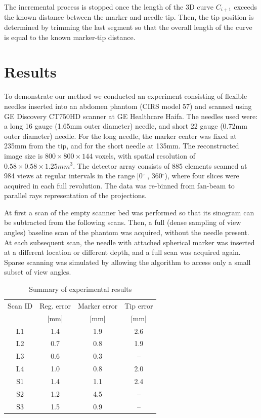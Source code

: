 \documentclass[letterpaper, 11 pt, conference]{ieeeconf}  %
\begin{document}
The incremental process is stopped once the length of the 3D curve $C_{i+1}$ exceeds the known distance between the marker and needle tip. Then, the tip position is determined by trimming the last segment so that the overall length of the curve is equal to the known marker-tip distance.

\section{Results}

To demonstrate our method we conducted an experiment consisting of flexible needles inserted into an abdomen phantom (CIRS model 57) and scanned using GE Discovery CT750HD scanner at GE Healthcare Haifa. The needles used were: a long 16 gauge (1.65mm outer diameter) needle, and short 22 gauge (0.72mm outer diameter) needle. For the long needle, the marker center was fixed at 235mm from the tip, and for the short needle at 135mm.
The reconstructed image size is $ 800 \times 800 \times 144 $ voxels, with spatial resolution of $0.58 \times 0.58 \times 1.25mm^3$. The detector array consists of 885 elements scanned at 984 views at regular intervals in the range [0$^{\circ}$ , 360$^{\circ}$), where four slices were acquired in each full revolution. The data was re-binned from fan-beam to parallel rays representation of the projections.

At first a scan of the empty scanner bed was performed so that its sinogram can be subtracted from the following scans. Then, a full (dense sampling of view angles) baseline scan of the phantom was acquired, without the needle present. At each subsequent scan, the needle with attached spherical marker was inserted at a different location or different depth, and a full scan was acquired again. Sparse scanning was simulated by allowing the algorithm to access only a small subset of view angles.

\begin{table}[t]
\caption{Summary of experimental results}
\label{results_table}
\begin{center}
\begin{tabular}{|c||c|c|c|}
\hline
Scan ID & Reg. error & Marker error & Tip error\\
  & [mm] & [mm] & [mm]\\
\hline
\hline
L1 & 1.4 & 1.9 & 2.6\\
\hline
L2 & 0.7 & 0.8 & 1.9\\
\hline
L3 & 0.6 & 0.3 & --\\
\hline
L4 & 1.0 & 0.8 & 2.0\\
\hline
S1 & 1.4 & 1.1 & 2.4\\
\hline
S2 & 1.2 & 4.5 & --\\
\hline
S3 & 1.5 & 0.9 & --\\
\hline
\end{tabular}
\end{center}
\end{table}
\end{document}

